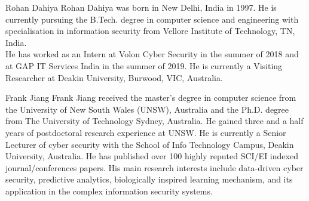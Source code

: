\documentclass[journal]{IEEEtran}
\begin{document}
%

% 
\newpage

\begin{IEEEbiography}{Rohan Dahiya}
Rohan Dahiya was born in New Delhi, India in 1997. He is currently pursuing the B.Tech. degree in computer science and engineering with specialisation in information security from Vellore Institute of Technology, TN, India. \\ He has worked as an Intern at Volon Cyber Security in the summer of 2018 and at GAP IT Services India in the summer of 2019. He is currently a Visiting Researcher at Deakin University, Burwood, VIC, Australia.
\end{IEEEbiography}

\begin{IEEEbiography}{Frank Jiang}
Frank Jiang received the master’s degree in computer science from the University of New South Wales (UNSW), Australia and the Ph.D. degree from The University of Technology Sydney, Australia. He gained three and a half years of postdoctoral research experience at UNSW. He is currently a Senior Lecturer of cyber security with the School of Info Technology Campus, Deakin University, Australia. He has published over 100 highly reputed SCI/EI indexed journal/conferences papers. His main research interests include data-driven cyber security, predictive analytics, biologically inspired learning mechanism, and its application in the complex information security systems.
\end{IEEEbiography}
\end{document}
